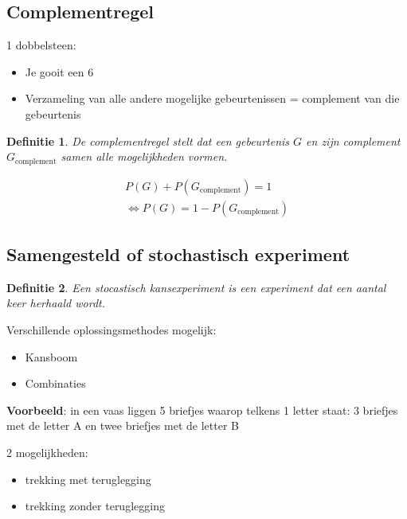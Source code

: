 \documentclass{article}
\newtheorem{theorem}{Definitie}[section]
\begin{document}
\subsection{Complementregel}

1 dobbelsteen:

\begin{itemize}
    \item Je gooit een 6
    \item Verzameling van alle andere mogelijke gebeurtenissen = complement van die gebeurtenis
\end{itemize}

\begin{theorem}
    De complementregel stelt dat een gebeurtenis $G$ en zijn complement $G_{\text{complement}}$ samen alle mogelijkheden vormen.

    \begin{equation}
        \begin{aligned}
            P(G) + P(G_{\text{complement}}) = 1\\
            \Leftrightarrow P(G) = 1 - P(G_{\text{complement}})
        \end{aligned}
    \end{equation}
\end{theorem}

\subsection{Samengesteld of stochastisch experiment}

\begin{theorem}
    Een stocastisch kansexperiment is een experiment dat een aantal keer herhaald wordt.
\end{theorem}

Verschillende oplossingsmethodes mogelijk:

\begin{itemize}
    \item Kansboom
    \item Combinaties
\end{itemize}

\textbf{Voorbeeld}: in een vaas liggen 5 briefjes waarop telkens 1 letter staat: 3 briefjes met de letter A en twee briefjes met de letter B

2 mogelijkheden: 

\begin{itemize}
    \item trekking met teruglegging
    \item trekking zonder teruglegging
\end{itemize}
\end{document}
